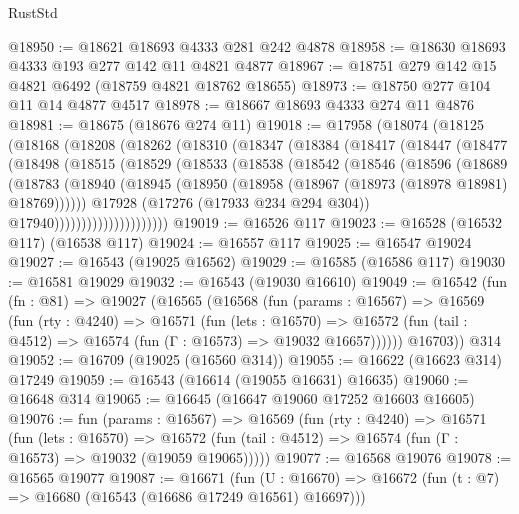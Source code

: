 \begin{lexlean}{RustStd}
\begin{coremodule}
@18950 := @18621 @18693 @4333 @281 @242 @4878
@18958 := @18630 @18693 @4333 @193 @277 @142 @11 @4821 @4877
@18967 := @18751 @279 @142 @15 @4821 @6492 (@18759 @4821 @18762 @18655)
@18973 := @18750 @277 @104 @11 @14 @4877 @4517
@18978 := @18667 @18693 @4333 @274 @11 @4876
@18981 := @18675 (@18676 @274 @11)
@19018 := @17958
    (@18074
      (@18125
        (@18168
          (@18208
            (@18262
              (@18310
                (@18347
                  (@18384
                    (@18417
                      (@18447
                        (@18477
                          (@18498
                            (@18515
                              (@18529
                                (@18533
                                  (@18538
                                    (@18542
                                      (@18546
                                        (@18596
                                          (@18689
                                            (@18783
                                              (@18940
                                                (@18945
                                                  (@18950
                                                    (@18958
                                                      (@18967 (@18973 (@18978 @18981) @18769))))))
                                              @17928
                                              (@17276 (@17933 @234 @294 @304))
                                              @17940)))))))))))))))))))))
@19019 := @16526 @117
@19023 := @16528 (@16532 @117) (@16538 @117)
@19024 := @16557 @117
@19025 := @16547 @19024
@19027 := @16543 (@19025 @16562)
@19029 := @16585 (@16586 @117)
@19030 := @16581 @19029
@19032 := @16543 (@19030 @16610)
@19049 := @16542
    (fun (fn : @81) =>
    @19027
      (@16565
        (@16568
          (fun (params : @16567) =>
          @16569
            (fun (rty : @4240) =>
            @16571
              (fun (lets : @16570) =>
              @16572 (fun (tail : @4512) => @16574 (fun (Γ : @16573) => @19032 @16657))))))
        @16703))
    @314
@19052 := @16709 (@19025 (@16560 @314))
@19055 := @16622 (@16623 @314) @17249
@19059 := @16543 (@16614 (@19055 @16631) @16635)
@19060 := @16648 @314
@19065 := @16645 (@16647 @19060 @17252 @16603 @16605)
@19076 := fun (params : @16567) =>
  @16569
    (fun (rty : @4240) =>
    @16571
      (fun (lets : @16570) =>
      @16572 (fun (tail : @4512) => @16574 (fun (Γ : @16573) => @19032 (@19059 @19065)))))
@19077 := @16568 @19076
@19078 := @16565 @19077
@19087 := @16671
    (fun (U : @16670) => @16672 (fun (t : @7) => @16680 (@16543 (@16686 @17249 @16561) @16697)))

\end{coremodule}
\end{lexlean}
